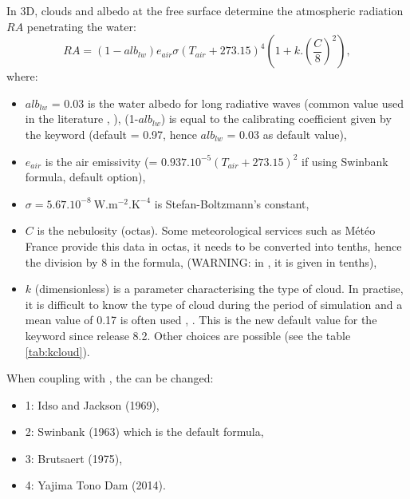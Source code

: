 In 3D, clouds and albedo at
the free surface determine the atmospheric radiation $RA$ penetrating the water:
\begin{equation*}
RA = (1-alb_{lw}) e_{air}\sigma(T_{air}+273.15)^{4}(1+k . \left( \frac{C}{8} \right)^{2}),
\end{equation*}
where:
\begin{itemize}
\item $alb_{lw}$ = 0.03 is the water albedo for long radiative waves
  (common value used in the literature \cite{imerito_dyresm_2007},
  \cite{henderson-sellers_energy_balance_1986}),
  (1-$alb_{lw}$) is equal to the calibrating coefficient given by the keyword
   (default = 0.97,
  hence $alb_{lw}$ = 0.03 as default value),
\item $e_{air}$ is the air emissivity (= $0.937.10^{-5}(T_{air}+273.15)^{2}$
if using Swinbank formula, default option),
\item $\sigma= 5.67.10^{-8}~\mathrm{{W.m^{-2}.K^{-4}}}$ is Stefan-Boltzmann's constant,
\item $C$ is the nebulosity (octas). Some meteorological services such as
M\'{e}t\'{e}o France provide this data in octas, it needs to be converted
into tenths, hence the division by 8 in the formula,
(WARNING: in \khione, it is given in tenths),
\item $k$ (dimensionless) is a parameter characterising the type of
cloud. In practise, it is difficult to know the type of cloud during the
period of simulation and a mean value of 0.17 is often used \cite{tva_heat_1972},
\cite{imerito_dyresm_2007}.
This is the new default value for the keyword
 since release 8.2.
Other choices are possible
(see the table \ref{tab:kcloud}).
\end{itemize}

When coupling \waqtel with , the 
can be changed:
\begin{itemize}
\item 1: Idso and Jackson (1969),
\item 2: Swinbank (1963) which is the default formula,
\item 3: Brutsaert (1975),
\item 4: Yajima Tono Dam (2014).
\end{itemize}

